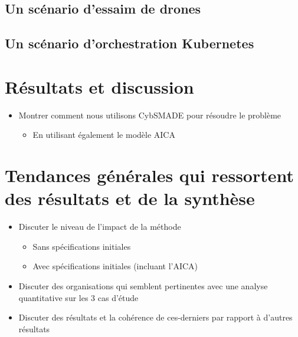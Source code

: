 \subsection{Un scénario d'essaim de drones}
\subsection{Un scénario d'orchestration Kubernetes}


\section{Résultats et discussion}
\begin{itemize}

    \item Montrer comment nous utilisons CybSMADE pour résoudre le problème
          \begin{itemize}
              \item En utilisant également le modèle AICA
          \end{itemize}
\end{itemize}

\section{Tendances générales qui ressortent des résultats et de la synthèse}
\begin{itemize}
    \item Discuter le niveau de l'impact de la méthode
          \begin{itemize}
              \item Sans spécifications initiales
              \item Avec spécifications initiales (incluant l'AICA)
          \end{itemize}
    \item Discuter des organisations qui semblent pertinentes avec une analyse quantitative sur les 3 cas d'étude
    \item Discuter des résultats et la cohérence de ces-derniers par rapport à d'autres résultats
\end{itemize}